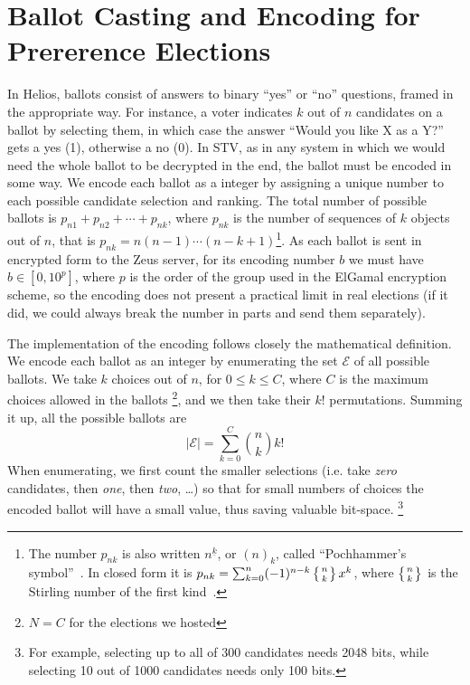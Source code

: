 \documentclass[letterpaper,twocolumn,10pt]{article}
\begin{document}
\section{Ballot Casting and Encoding for Prererence Elections}

In Helios, ballots consist of answers to binary ``yes'' or ``no''
questions, framed in the appropriate way. For instance, a voter
indicates $k$ out of $n$ candidates on a ballot by selecting them, in
which case the answer ``Would you like X as a Y?'' gets a yes (1),
otherwise a no (0). In STV, as in any system in which we would need
the whole ballot to be decrypted in the end, the ballot must be
encoded in some way. We encode each ballot as a integer by assigning a
unique number to each possible candidate selection and ranking. The
total number of possible ballots is $p _{n1} + p_{n2} + \cdots + p
_{nk}$, where $p_{nk}$ is the number of sequences of $k$ objects out
of $n$, that is $p_{nk} = n(n - 1)\cdots(n - k + 1)$\footnote{The
  number $p_{nk}$ is also written $n^{\underline{k}}$, or $(n)_k$,
  called ``Pochhammer's symbol''~\cite[p.\ 48]{graham:1994}. In closed
  form it is $p_{nk} = \sum_{k=0}^{n} (-1)^{n-k}\left\{n \atop
    k\right\}x^k$, where $\left\{n \atop k\right\}$ is the Stirling
  number of the first kind~\cite{weisstein:pochhammer}.}. As each
ballot is sent in encrypted form to the Zeus server, for its encoding
number $b$ we must have $b \in [0, 10^p]$, where $p$ is the order of
the group used in the ElGamal encryption scheme, so the encoding does
not present a practical limit in real elections (if it did, we could
always break the number in parts and send them separately).

The implementation of the encoding follows closely the mathematical
definition. We encode each ballot as an integer by enumerating the set
$\mathcal{E}$ of all possible ballots. We take $k$ choices out of $n$,
for $0\leq k \leq C$, where $C$ is the maximum choices allowed in the
ballots \footnote{$N=C$ for the elections we hosted}, and we then take
their $k!$ permutations. Summing it up, all the possible ballots are
\begin{equation}
\label{eq:max_encoded}
|\mathcal{E}| = \sum^{C}_{k=0}\binom{n}{k}k!
\end{equation}
When enumerating, we first count the smaller selections (i.e. take
\textit{zero} candidates, then \textit{one}, then \textit{two},
\ldots) so that for small numbers of choices the encoded ballot will
have a small value, thus saving valuable bit-space. \footnote{ For
  example, selecting up to all of 300 candidates needs 2048 bits,
  while selecting 10 out of 1000 candidates needs only 100 bits.}
\end{document}
